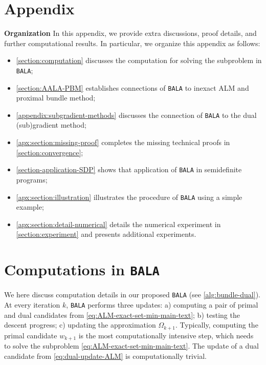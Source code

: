 \documentclass[11pt]{article}
\newcommand{\alg}{\texttt{BALA}}%
\begin{document}
{\small 


}

\small 
\newpage
\appendix
{}
\section*{Appendix}

\textbf{Organization} In this appendix, we provide extra discussions, proof details, and further computational results. In particular, we organize this appendix as follows:

\vspace{-2mm}

\begin{itemize}
\setlength{\itemsep}{0pt}
\item \cref{section:computation} discusses the computation for solving the subproblem in \alg{};
\item \cref{section:AALA-PBM} establishes connections of \alg{} to inexact ALM and proximal bundle method;
\item \cref{appendix:subgradient-methods} discusses the connection of \alg{} to the dual (sub)gradient method;
\item \cref{apx:section:missing-proof} completes the missing technical proofs in \cref{section:convergence}; 
\item \cref{section-application-SDP} shows that application of \alg{} in semidefinite programs;
\item \cref{apx:section:illustration} illustrates the procedure of \alg{} using a simple example;
\item \cref{apx:section:detail-numerical} details the numerical experiment in \cref{section:experiment} and presents additional experiments. 
\end{itemize}


\section{Computations in \alg} \label{appendix:computations-of-BALA}
\label{section:computation}
We here discuss computation details in our proposed \alg{} (see \cref{alg:bundle-dual}). At every iteration $k$, \alg{} performs three updates: a) computing a pair of primal and dual candidates from \cref{eq:ALM-exact-set-min-main-text}; b) testing the descent progress; c) updating the approximation $\Omega_{k+1}$. Typically, computing the primal candidate $w_{k+1}$ is the most computationally intensive step, which needs to solve the subproblem \cref{eq:ALM-exact-set-min-main-text}. 
The update of a dual candidate from \cref{eq:dual-update-ALM} is computationally trivial. 
\end{document}

